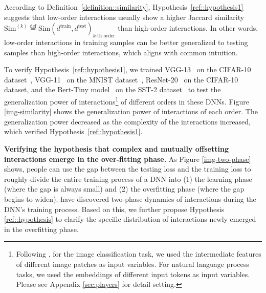 \documentclass[10pt,twocolumn,letterpaper]{article}
\begin{document}
According to Definition~\ref{definition::similarity}, Hypothesis~\ref{ref::hypothesis1} suggests that low-order interactions usually show a higher Jaccard similarity $\text{Sim}^{(k)} \overset{\text{def}}{=}\text{Sim}(d^{\text{train}}, d^{\text{test}})_{k\text{-th order}}$ than high-order interactions. In other words, low-order interactions in training samples can be better generalized to testing samples than high-order interactions, which aligns with common intuition.


To verify Hypothesis~\ref{ref::hypothesis1}, we trained VGG-13~\citep{simonyan2014very} on the CIFAR-10 dataset~\citep{krizhevsky2009learning}, VGG-11~\citep{simonyan2014very} on the MNIST dataset~\citep{lecun1998gradient}, ResNet-20~\citep{he2016deep} on the CIFAR-10 dataset, and the Bert-Tiny model~\citep{devlin2018bert} on the SST-2 dataset~\citep{socher2013recursive} to test the generalization power of interactions\footnote[8]{\label{ref::input-varibale}
Following \citep{li2023does}, for the image classification task, we used the intermediate features of different image patches as input variables. For natural language process tasks, we used the embeddings of different input tokens as input variables. Please see Appendix \ref{sec:players} for detail setting. } of different orders in these DNNs. Figure \ref{img-similarity}
shows the generalization power of interactions of each order. The generalization power decreased as the complexity of the interactions increased, which verified Hypothesis~\ref{ref::hypothesis1}.

\textbf{Verifying the hypothesis that complex and mutually offsetting interactions emerge in the over-fitting phase.}
As Figure \ref{img-two-phase} shows, people can use the gap between the testing loss and the training loss to roughly divide the entire training process of a DNN into (1) the learning phase (where the gap is always small) and (2) the overfitting phase (where the gap begins to widen).
\citet{ren2024towards} have discovered two-phase dynamics of interactions during the DNN's training process.
Based on this, we further propose Hypothesis \ref{ref::hypothesis} to clarify the specific distribution of interactions newly emerged in the overfitting phase.
\end{document}
